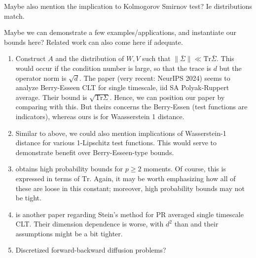 Maybe also mention the implication to Kolmogorov Smirnov test? 
Ie distributions match. 








{\color{red}Maybe we can demonstrate a few examples/applications, and instantiate our bounds here? 
Related work can also come here if adequate. 
\begin{enumerate}
    \item Construct $A$ and the distribution of $W, V$ such that $\lVert \bar{\Sigma} \rVert \ll \mathrm{Tr} \bar{\Sigma}$.
    This would occur if the condition number is large, so that the trace is $d$ but the operator norm is $\sqrt{d}$. 
    The paper \citep{samsonov2024gaussian} (very recent: NeurIPS 2024) seems to analyze Berry-Esseen CLT for single timescale, iid SA Polyak-Ruppert average. 
    Their bound is $\sqrt{\mathrm{Tr} \Sigma}$. 
    Hence, we can position our paper by comparing with this. 
    But theirs concerns the Berry-Essen (test functions are indicators), whereas ours is for Waasserstein 1 distance. 
    \item Similar to above, we could also mention implications of Wasserstein-1 distance for various 1-Lipschitz test functions. This would serve to demonstrate benefit over Berry-Esseen-type bounds. 
    \item \citet{durmus2024finite} obtains high probability bounds for $p \geq 2$ moments. Of course, this is expressed in terms of $\mathrm{Tr}$. Again, it may be worth emphasizing how all of these are loose in this constant; moreover, high probability bounds may not be tight. 
    \item \citep{anastasiou2019normal} is another paper regarding Stein's method for PR averaged single timescale CLT. Their dimension dependence is worse, with $d^2$ than \citep{srikant2024CLT} and their assumptions might be a bit tighter. 
    \item Discretized forward-backward diffusion problems? 
\end{enumerate}
}





